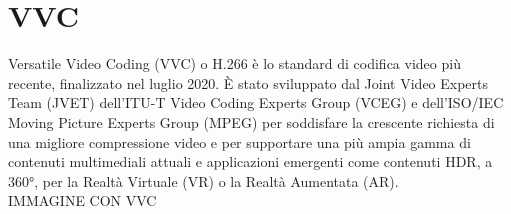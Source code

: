 \section{VVC}
Versatile Video Coding (VVC) o H.266 è lo standard di codifica video più recente, finalizzato nel luglio 2020. È stato sviluppato dal Joint Video Experts Team (JVET) dell'ITU-T Video Coding Experts Group (VCEG) e dell'ISO/IEC Moving Picture Experts Group (MPEG) per soddisfare la crescente richiesta di una migliore compressione video e per supportare una più ampia gamma di contenuti multimediali attuali e applicazioni emergenti come contenuti HDR, a 360°, per la Realtà Virtuale (VR) o la Realtà Aumentata (AR).\cite{9503377}\\
IMMAGINE CON VVC
